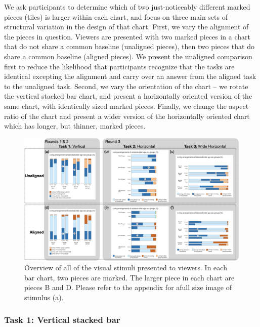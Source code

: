 \documentclass[
]{jds}
\begin{document}
We ask participants to determine which of two just-noticeably different
marked pieces (tiles) is larger within each chart, and focus on three
main sets of structural variation in the design of that chart. First, we
vary the alignment of the pieces in question. Viewers are presented with
two marked pieces in a chart that do not share a common baseline
(unaligned pieces), then two pieces that do share a common baseline
(aligned pieces). We present the unaligned comparison first to reduce
the likelihood that participants recognize that the tasks are identical
excepting the alignment and carry over an answer from the aligned task
to the unaligned task. Second, we vary the orientation of the chart --
we rotate the vertical stacked bar chart, and present a horizontally
oriented version of the same chart, with identically sized marked
pieces. Finally, we change the aspect ratio of the chart and present a
wider version of the horizontally oriented chart which has longer, but
thinner, marked pieces.

\begin{figure}[hbt]

{\centering \includegraphics[width=1\textwidth,height=\textheight]{images/stimuli-overview-1.png}

}

\caption{\label{fig-tasks}Overview of all of the visual stimuli
presented to viewers. In each bar chart, two pieces are marked. The
larger piece in each chart are pieces B and D. Please refer to the
appendix for afull size image of stimulus (a).}

\end{figure}

\hypertarget{task-1-vertical-stacked-bar}{%
\subsubsection{Task 1: Vertical stacked
bar}\label{task-1-vertical-stacked-bar}}
\end{document}
